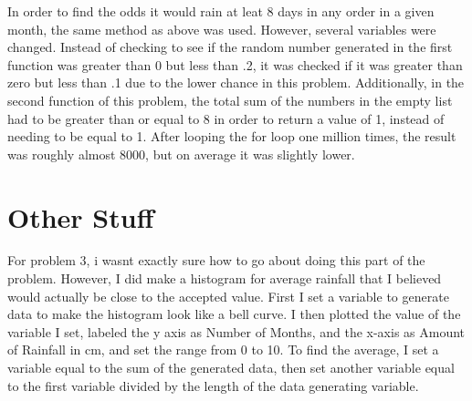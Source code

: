 \documentclass[twocolumn]{revtex4}
\begin{document}
	In order to find the odds it would rain at leat 8 days in any order in a given month, the same method as above was used. However, several variables were changed. Instead of checking to see if the random number generated in the first function was greater than 0 but less than .2, it was checked if it was greater than zero but less than .1 due to the lower chance in this problem. Additionally, in the second function of this problem, the total sum of the numbers in the empty list had to be greater than or equal to 8 in order to return a value of 1, instead of needing to be equal to 1.  After looping the for loop one million times, the result was roughly almost 8000, but on average it was slightly lower.
	
\section{Other Stuff}
	For problem 3, i wasnt exactly sure how to go about doing this part of the problem. However, I did make a histogram for average rainfall that I believed would actually be close to the accepted value. First I set a variable to generate data to make the histogram look like a bell curve. I then plotted the value of the variable I set, labeled the y axis as Number of Months, and the x-axis as Amount of Rainfall in cm, and set the range from 0 to 10.
	To find the average, I set a variable equal to the sum of the generated data, then set another variable equal to the first variable divided by the length of the data generating variable.
\end{document}
